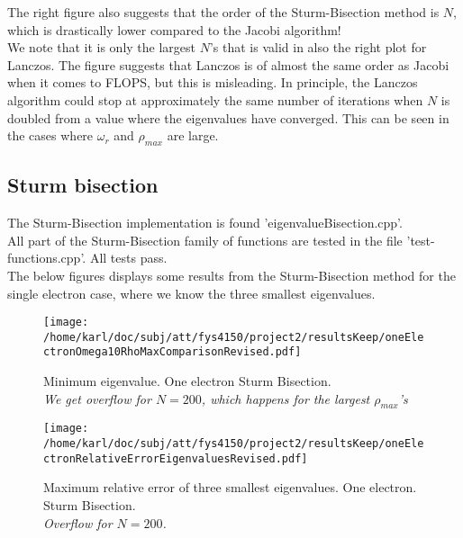 \documentclass{article}
\begin{document}
The right figure also suggests that the order of the Sturm-Bisection method is $N$, which is drastically lower compared to the Jacobi algorithm! \\

We note that it is only the largest $N$'s that is valid in also the right plot for Lanczos. The figure suggests that Lanczos is of almost the same order as Jacobi when it comes to FLOPS, but this is misleading. In principle, the Lanczos algorithm could stop at approximately the same number of iterations when $N$ is doubled from a value where the eigenvalues have converged. This can be seen in the cases where $\omega_r$ and $\rho_{max}$ are large.



\subsection{Sturm bisection}
The Sturm-Bisection implementation is found 'eigenvalueBisection.cpp'.\\

All part of the Sturm-Bisection family of functions are tested in the file 'test-functions.cpp'. All tests pass. \\

The below figures displays some results from the Sturm-Bisection method for the single electron case, where we know the three smallest eigenvalues.

\begin{minipage}{.49\textwidth} %
	\begin{figure}[H]
		\centering
		\texttt{[image: /home/karl/doc/subj/att/fys4150/project2/resultsKeep/oneElectronOmega10RhoMaxComparisonRevised.pdf]}
		\caption{Minimum eigenvalue. One electron Sturm Bisection.\\ \textit{We get overflow for $N=200$, which happens for the largest $\rho_{max}$'s}}
		\label{1}
	\end{figure}
\end{minipage}\hfill
\begin{minipage}{.49\textwidth}
	\begin{figure}[H]
		\centering
		\texttt{[image: /home/karl/doc/subj/att/fys4150/project2/resultsKeep/oneElectronRelativeErrorEigenvaluesRevised.pdf]}
		\caption{Maximum relative error of three smallest eigenvalues. One electron. Sturm Bisection.\\ \textit{Overflow for $N=200$.}}
		\label{1}
	\end{figure}
\end{minipage}\hfill
\vspace{2ex}
\end{document}
